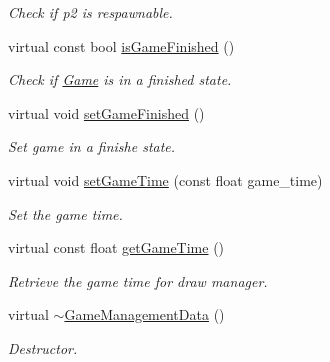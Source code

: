\begin{DoxyCompactItemize}
\begin{DoxyCompactList}\small\item\em Check if p2 is respawnable. \end{DoxyCompactList}\item 
virtual const bool \hyperlink{classGameManagementData_ac8d6deb9285fe8e5205f9984b0a2622d}{is\-Game\-Finished} ()
\begin{DoxyCompactList}\small\item\em Check if \hyperlink{classGame}{Game} is in a finished state. \end{DoxyCompactList}\item 
virtual void \hyperlink{classGameManagementData_afef95ac9618619ca6ec29277fd04c361}{set\-Game\-Finished} ()
\begin{DoxyCompactList}\small\item\em Set game in a finishe state. \end{DoxyCompactList}\item 
virtual void \hyperlink{classGameManagementData_ae3ed7d9a9cbed2222ad34c52a4bcfd5c}{set\-Game\-Time} (const float game\-\_\-time)
\begin{DoxyCompactList}\small\item\em Set the game time. \end{DoxyCompactList}\item 
virtual const float \hyperlink{classGameManagementData_aa507f9e395464888ad9dc66a90b1bbc3}{get\-Game\-Time} ()
\begin{DoxyCompactList}\small\item\em Retrieve the game time for draw manager. \end{DoxyCompactList}\item 
virtual \hyperlink{classGameManagementData_aa665bdaa6c75dcf11c5e24bc6173d07b}{$\sim$\-Game\-Management\-Data} ()
\begin{DoxyCompactList}\small\item\em Destructor. \end{DoxyCompactList}\end{DoxyCompactItemize}
